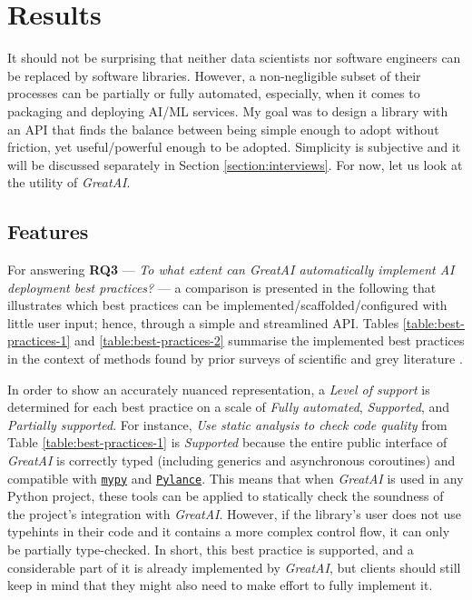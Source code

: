 \chapter{Results} \label{chapter:interviews}

It should not be surprising that neither data scientists nor software engineers can be replaced by software libraries. However, a non-negligible subset of their processes can be partially or fully automated, especially, when it comes to packaging and deploying AI/ML services. My goal was to design a library with an API that finds the balance between being simple enough to adopt without friction, yet useful/powerful enough to be adopted. Simplicity is subjective and it will be discussed separately in Section \ref{section:interviews}. For now, let us look at the utility of \textit{GreatAI}.

\section{Features} \label{section:features}

For answering \textbf{RQ3} --- \textit{To what extent can \textit{GreatAI} automatically implement AI deployment best practices?} --- a comparison is presented in the following that illustrates which best practices can be implemented/scaffolded/configured with little user input; hence, through a simple and streamlined API. Tables \ref{table:best-practices-1} and \ref{table:best-practices-2} summarise the implemented best practices in the context of methods found by prior surveys of scientific and grey literature \cite{serban2020adoption,serban2021practices,john2020architecting}.

In order to show an accurately nuanced representation, a \textit{Level of support} is determined for each best practice on a scale of \textit{Fully automated}, \textit{Supported}, and \textit{Partially supported}. For instance, \textit{Use static analysis to check code quality} from Table \ref{table:best-practices-1} is \textit{Supported} because the entire public interface of \textit{GreatAI} is correctly typed (including generics and asynchronous coroutines) and compatible with \href{https://mypy.readthedocs.io/en/stable/index.html#}{\texttt{mypy}} and \href{https://marketplace.visualstudio.com/items?itemName=ms-python.vscode-pylance}{\texttt{Pylance}}. This means that when \textit{GreatAI} is used in any Python project, these tools can be applied to statically check the soundness of the project's integration with \textit{GreatAI}. However, if the library's user does not use typehints in their code and it contains a more complex control flow, it can only be partially type-checked. In short, this best practice is supported, and a considerable part of it is already implemented by \textit{GreatAI}, but clients should still keep in mind that they might also need to make effort to fully implement it.

